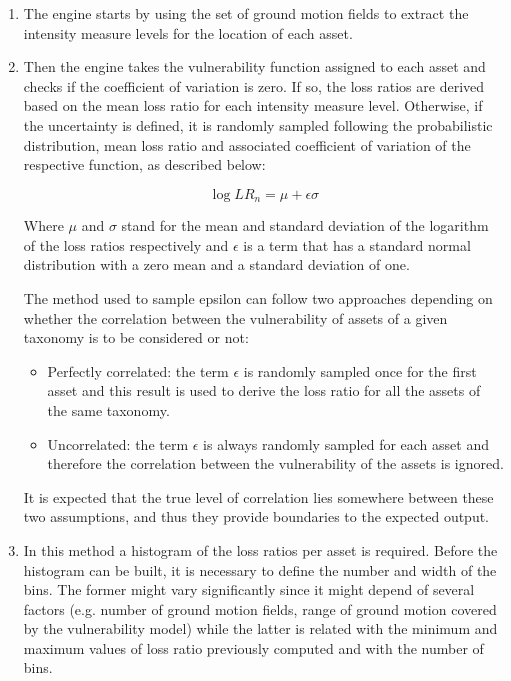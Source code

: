\begin{enumerate}
\item The  engine starts by using the set of ground motion fields to extract the intensity measure levels for the location of each asset. 
 
\item Then the engine takes the vulnerability function assigned to each asset and checks if the coefficient of variation is zero. If so, the loss ratios are derived based on the mean loss ratio for each intensity measure level. Otherwise, if the uncertainty is defined, it is randomly sampled following the probabilistic distribution, mean loss ratio and associated coefficient of variation of the respective function, as described below:

\begin{equation}
\log{LR_n} = \mu + \epsilon\sigma
\end{equation}

Where $\mu$ and $\sigma$ stand for the mean and standard deviation of the logarithm of the loss ratios respectively and $\epsilon$ is a term that has a standard normal distribution with a zero mean and a standard deviation of one.  

The method used to sample epsilon can follow two approaches depending on whether the correlation between the vulnerability of assets of a given taxonomy is to be considered or not:

\begin{itemize}

\item Perfectly correlated: the term $\epsilon$ is randomly sampled once for the first asset and this result is used to derive the loss ratio for all the assets of the same taxonomy. 

\item Uncorrelated: the term $\epsilon$ is always randomly sampled for each asset and therefore the correlation between the vulnerability of the assets is ignored.

\end{itemize}

It is expected that the true level of correlation lies somewhere between these two assumptions, and thus they provide boundaries to the expected output. 

\item In this method a histogram of the loss ratios per asset is required. Before the histogram can be built, it is necessary to define the number and width of the bins. The former might vary significantly since it might depend of several factors (e.g. number of ground motion fields, range of ground motion covered by the vulnerability model) while the latter is related with the minimum and maximum values of loss ratio previously computed and with the number of bins. 


\end{enumerate}
